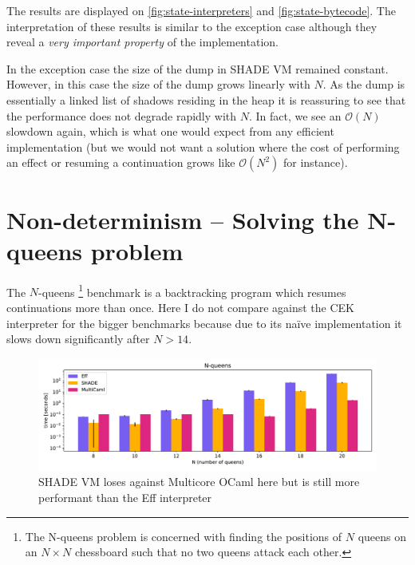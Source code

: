 \documentclass[class=article, crop=false]{standalone}
\begin{document}
The results are displayed on \autoref{fig:state-interpreters} and
\autoref{fig:state-bytecode}. The interpretation of these results is similar to
the exception case although they reveal a \emph{very important property} of the implementation.

In the exception case the size of the dump in SHADE VM remained constant.
However, in this case the size of the dump grows
linearly with $N$. As the dump is essentially a linked list of shadows residing
in the heap it is reassuring to see that the performance does not degrade
rapidly with $N$. In fact, we see an $\mathcal{O}(N)$ slowdown again, which is
what one would expect from any efficient implementation (but we would not want a
solution where the cost of performing an effect or resuming a continuation grows
like $\mathcal{O}(N^2)$ for instance).

\section{Non-determinism -- Solving the N-queens problem}

The $N$-queens%
\footnote{The N-queens problem is concerned with finding the positions of $N$
queens on an $N \times N$ chessboard such that no two queens attack each other.}
benchmark is a backtracking program which resumes continuations more than once.
Here I do not compare against the CEK interpreter for the bigger benchmarks
because due to its naïve implementation it slows down significantly after
$N > 14$. 

\begin{figure}
    \centering
    \captionsetup{width=.8\linewidth}
    \includegraphics[width=.9\linewidth]{eval_plots/comp_queens.pdf}
    \caption[N-queens benchmark]{\small SHADE VM loses against Multicore OCaml here but is still more performant than the Eff interpreter}
    \label{fig:n-queens}
\end{figure}
\end{document}
